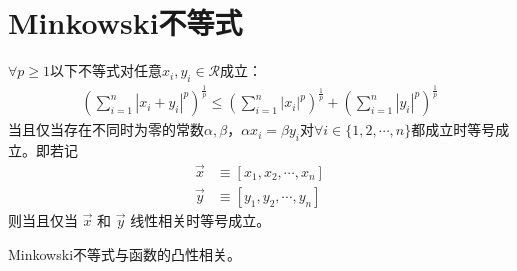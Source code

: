 
\section{Minkowski不等式}
\label{sec:minkowski-inequality}


\begin{theorem}[Minkowski不等式]
  $\forall p\ge 1$以下不等式对任意$x_i,y_i\in\mathcal{R}$成立：
  \begin{align}
    \left(\sum_{i=1}^{n}\left|x_i+y_i\right|^p\right)^\frac{1}{p}
    \le
    \left(\sum_{i=1}^{n}\left|x_i\right|^p\right)^\frac{1}{p}
    +
    \left(\sum_{i=1}^{n}\left|y_i\right|^p\right)^\frac{1}{p}
  \end{align}
  当且仅当存在不同时为零的常数$\alpha,\beta$，$\alpha x_i=\beta
  y_i$对$\forall i\in\{1,2,\cdots,n\}$都成立时等号成立。即若记
  \begin{align*}
    \vec{x}&\equiv\left[x_1,x_2,\cdots,x_n\right]\\
    \vec{y}&\equiv\left[y_1,y_2,\cdots,y_n\right]
  \end{align*}
  则当且仅当 $\vec{x}$ 和 $\vec{y}$ 线性相关时等号成立。
\end{theorem}

Minkowski不等式与函数的凸性相关。

